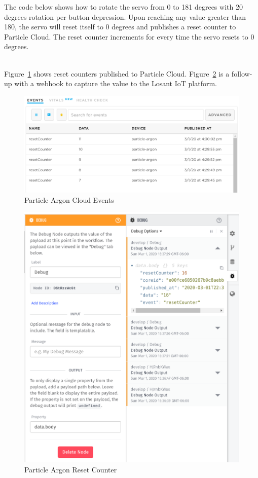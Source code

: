 \documentclass{article}
\begin{document}
The code below shows how to rotate the servo from 0 to 181 degrees with 20 degrees rotation per button depression. Upon reaching any value greater than 180, the servo will reset itself to 0 degrees and publishes a reset counter to Particle Cloud. The reset counter increments for every time the servo resets to 0 degrees.\\

\begin{minipage}[c]{\textwidth}

\end{minipage}\ \\

Figure~\ref{fig:events} shows reset counters published to Particle Cloud. Figure~\ref{fig:resetCounter} is a follow-up with a webhook to capture the value to the Losant IoT platform.

\begin{figure}[H]
\center
\includegraphics[width=\textwidth]{images/events.png}
\caption{Particle Argon Cloud Events}
\label{fig:events}
\end{figure}

\begin{figure}[H]
\center
\includegraphics[width=.8\textwidth]{images/resetCounter.png}
\caption{Particle Argon Reset Counter}
\label{fig:resetCounter}
\end{figure}
\end{document}
